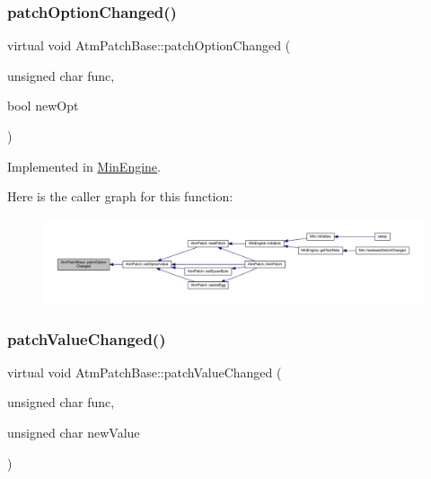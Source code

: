\subsubsection{\texorpdfstring{patch\+Option\+Changed()}{patchOptionChanged()}}
{\footnotesize\ttfamily virtual void Atm\+Patch\+Base\+::patch\+Option\+Changed (\begin{DoxyParamCaption}\item[{unsigned char}]{func,  }\item[{bool}]{new\+Opt }\end{DoxyParamCaption})\hspace{0.3cm}{\ttfamily [pure virtual]}}



Implemented in \hyperlink{class_min_engine_aff5a85aae7d6f6e5edd571c73c071871}{Min\+Engine}.

Here is the caller graph for this function\+:
\nopagebreak
\begin{figure}[H]
\begin{center}
\leavevmode
\includegraphics[width=350pt]{class_atm_patch_base_ad31f8d45a0a630ee3052d69ee125e2f3_icgraph}
\end{center}
\end{figure}
\mbox{\label{class_atm_patch_base_ad561145330e0b53990f222c243ef5e89}} 
\subsubsection{\texorpdfstring{patch\+Value\+Changed()}{patchValueChanged()}}
{\footnotesize\ttfamily virtual void Atm\+Patch\+Base\+::patch\+Value\+Changed (\begin{DoxyParamCaption}\item[{unsigned char}]{func,  }\item[{unsigned char}]{new\+Value }\end{DoxyParamCaption})\hspace{0.3cm}{\ttfamily [pure virtual]}}



